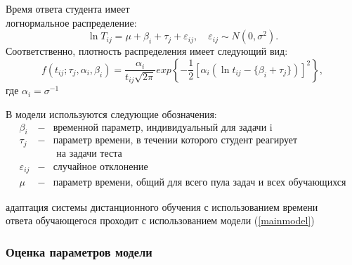 Время ответа студента имеет \\логнормальное распределение:
\begin{equation}
\label{mainmodel}
\ln T_{ij} = \mu + \beta_i + \tau_j + \varepsilon_{ij},\quad \varepsilon_{ij} \sim N(0,\sigma^2).
\end{equation}
Соответственно, плотность распределения имеет следующий вид:
\begin{equation}
f(t_{ij};\tau_j,\alpha_i,\beta_i) = \frac{\alpha_i}{t_{ij}\sqrt{2\pi}}exp\left\{ -\frac{1}{2}[\alpha_i(\ln t_{ij} - \{\beta_i + \tau_j\})]^2 \right\},
\end{equation}
где $\alpha_i = \sigma^{-1}$

В модели используются следующие обозначения:
$$
\begin{array}{lll}
\beta_i &-& \mbox{временной параметр, индивидуальный для задачи i}\\
\tau_j &-& \mbox{параметр времени, в течении которого студент реагирует }  \\
& &\mbox{ на задачи теста }\\
\varepsilon_{ij} &-& \mbox{случайное отклонение}\\
\mu &-& \mbox{параметр времени, общий для всего пула задач и всех обучающихся}
\end{array}
$$

адаптация системы дистанционного обучения с использованием времени \\ответа обучающегося проходит с использованием модели (\ref{mainmodel})

\subsubsection{Оценка параметров модели}
\label{opm}

